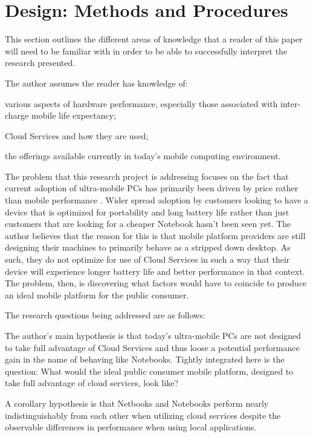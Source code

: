 \section{Design: Methods and Procedures}

This section outlines the different areas of knowledge that a reader of this
paper will need to be familiar with in order to be able to successfully
interpret the research presented.

The author assumes the reader has knowledge of:
\begin{inparaenum}[(1)]
\item various aspects of hardware performance, especially those associated with
  inter-charge mobile life expectancy;
\item Cloud Services and how they are used;
\item the offerings available currently in today's mobile
  computing environment.
\end{inparaenum}

The problem that this research project is addressing focuses on the fact that
current adoption of ultra-mobile PCs has primarily been driven by price rather
than mobile performance \citep{ap2009}.  Wider spread adoption by customers
looking to have a device that is optimized for portability and long battery life
rather than just customers that are looking for a cheaper Notebook hasn't been
seen yet.  The author believes that the reason for this is that mobile platform
providers are still designing their machines to primarily behave as a stripped
down desktop.  As such, they do not optimize for use of Cloud Services in such a
way that their device will experience longer battery life and better performance
in that context.  The problem, then, is discovering what factors would have to
coincide to produce an ideal mobile platform for the public consumer.

The research questions being addressed are as follows:
\begin{inparaenum}[(1)]
  \item The author's main hypothesis is that today's ultra-mobile PCs are not
    designed to take full advantage of Cloud Services and thus loose a potential
    performance gain in the name of behaving like Notebooks.  Tightly integrated
    here is the question: What would the ideal public consumer mobile platform,
    designed to take full advantage of cloud services, look like?
  \item A corollary hypothesis is that Netbooks and Notebooks perform nearly
    indistinguishably from each other when utilizing cloud services despite the
    observable differences in performance when using local applications.
\end{inparaenum}

